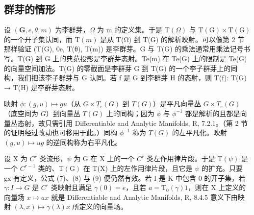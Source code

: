 \subsection{群芽的情形}

设 \((\mathbf{G}, e, \theta, m)\) 为李群芽，\(\Omega\) 为 m 的定义集。于是 \(\mathrm{T}(\Omega)\) 与 \(\mathrm{T}(\mathrm{G}) \times \mathrm{T}(\mathrm{G})\) 的一个开子集认同，而 \(\mathrm{T}(m)\) 是从 T(Ω) 到 T(G) 的解析映射。可以像第 2 节那样验证 (T(G), 0e, T(θ), T(m)) 是李群芽。G 与 T(G) 的乘法通常用乘法记号书写。T(G) 到 G 上的典范投影是李群芽态射。Te(m) 在 Te(G) 上的限制是 Te(G) 的向量空间加法。T(G) 的零截面是李群芽 G 到 T(G) 的一个李子群芽上的同构，我们把该李子群芽与 G 认同。若 f 是 G 到李群芽 H 的态射，则 T(f): T(G) → T(H) 是李群芽态射。

映射 \(\phi\colon(g,u)\mapsto gu\)（从 \(G\times T_{e}(G)\) 到 \(T(G)\)）是平凡向量丛 \(G\times T_{e}(G)\)（底空间为 \(G\)）到向量丛 \(T(G)\) 上的同构；因为 \(\phi\) 与 \(\phi^{-1}\) 都是解析的且都是向量丛态射，故只需引用 Differentiable and Analytic Manifolds, R, 7.2.1。（第 2 节的证明经过改动也可移用于此。）同构 \(\phi^{-1}\) 称为 \(T(G)\) 的左平凡化。映射 \((g,u)\mapsto ug\) 的逆同构称为右平凡化。

设 X 为 \(C^{r}\) 类流形，\(\psi\) 为 G 在 X 上的一个 \(C^{r}\) 类左作用律片段。于是 \(\mathrm{T}(\psi)\) 是一个 \(C^{r-1}\) 类的、\(\mathrm{T}(\mathrm{G})\) 在 T(X) 上的左作用律片段，且它是 \(\psi\) 的扩充。只要 gx 有定义，公式 (7)、(8) 与 (9) 便仍然有效。若 I 是 K 中包含 0 的开子集，若 \(\gamma: I \to G\) 是 \(C^{r}\) 类映射且满足 \(\gamma(0) = e\)，且若 \(a = \mathrm{T}_{0}(\gamma)1\)，则在 X 上定义的向量场 \(x \mapsto ax\) 就是 Differentiable and Analytic Manifolds, R, 8.4.5 意义下由映射 \((\lambda, x) \mapsto \gamma(\lambda)x\) 所定义的向量场。

